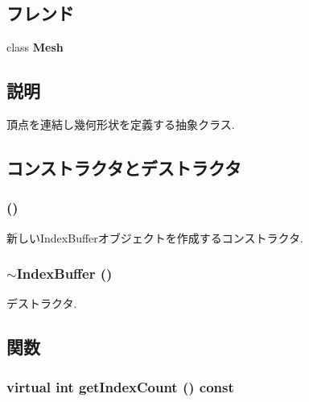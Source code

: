 \subsection*{フレンド}
\begin{CompactItemize}
\item 
\hypertarget{classm3g_1_1IndexBuffer_a41a130f156b145bffb3f4b5172c4c93}{
class \textbf{Mesh}}
\label{classm3g_1_1IndexBuffer_a41a130f156b145bffb3f4b5172c4c93}

\end{CompactItemize}


\subsection{説明}
頂点を連結し幾何形状を定義する抽象クラス. 

\subsection{コンストラクタとデストラクタ}
\hypertarget{classm3g_1_1IndexBuffer_d2e68a2d7c6c753d3abfeef42ee79427}{
\subsubsection[{IndexBuffer}]{ ()}}
\label{classm3g_1_1IndexBuffer_d2e68a2d7c6c753d3abfeef42ee79427}


新しいIndexBufferオブジェクトを作成するコンストラクタ. \hypertarget{classm3g_1_1IndexBuffer_ac7952364fe4d2d7b2731da5380c841c}{
\subsubsection[{$\sim$IndexBuffer}]{\setlength{\rightskip}{0pt plus 5cm}$\sim${\bf IndexBuffer} ()}}
\label{classm3g_1_1IndexBuffer_ac7952364fe4d2d7b2731da5380c841c}


デストラクタ. 

\subsection{関数}
\hypertarget{classm3g_1_1IndexBuffer_ac7d2c37f177b21195a81f00061ef94e}{
\subsubsection[{getIndexCount}]{\setlength{\rightskip}{0pt plus 5cm}virtual int getIndexCount () const}}
\label{classm3g_1_1IndexBuffer_ac7d2c37f177b21195a81f00061ef94e}


